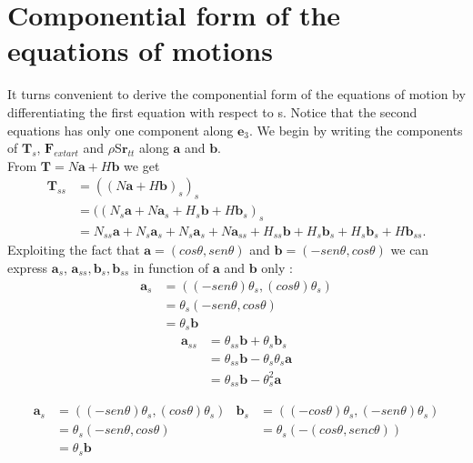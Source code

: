 

\section{Componential form of the equations of motions}\label{componential-form-of-the-equations-of-motion}
It turns convenient to derive the componential form of the equations of motion by differentiating the first equation with respect to s.
Notice that the second equations has only one component along $\mathbf{e}_3$.
We begin by writing the components of $\mathbf{T}_s$, $\mathbf{F}_{extart}$ and $\rho$S$\mathbf{r}_{tt}$ along $\mathbf{a}$ and $\mathbf{b}$.\\
From $\mathbf{T}=N\mathbf{a}+H\mathbf{b}$ we get
\begin{equation}
\begin{split}
\mathbf{T}_{ss}& =((N\mathbf{a}+H\mathbf{b})_s)_s\\
               & =((N_s\mathbf{a}+ N\mathbf{a}_s + H_s\mathbf{b} + H\mathbf{b}_s)_s\\
               & = N_{ss}\mathbf{a} + N_s\mathbf{a}_s + N_s\mathbf{a}_s + N\mathbf{a}_{ss} + H_{ss}\mathbf{b} + H_s\mathbf{b}_s + H_s\mathbf{b}_s + H\mathbf{b}_{ss}.
\end{split}
\end{equation}
Exploiting the fact that $\mathbf{a}=(cos\theta, sen\theta)$ and $\mathbf{b}=(-sen\theta, cos\theta)$ we can express $\mathbf{a}_s$, $\mathbf{a}_{ss}, \mathbf{b}_s, \mathbf{b}_{ss}$ in function of $\mathbf{a}$ and $\mathbf{b}$ only :
\begin{equation}
\begin{split}
\mathbf{a}_s& = ((-sen\theta)\theta_s, (cos\theta)\theta_s)\\
            & = \theta_s(-sen\theta, cos\theta)\\
            & =\theta_s\mathbf{b}
\end{split}
\end{equation}
\begin{equation}
\begin{split}
\mathbf{a}_{ss}& = \theta_{ss}\mathbf{b}+\theta_s\mathbf{b}_s \\
               & = \theta_{ss}\mathbf{b} - \theta_s\theta_s\mathbf{a}\\
               & = \theta_{ss}\mathbf{b} - \theta_s^2\mathbf{a}
\end{split}
\end{equation}

\begin{align}
\mathbf{a}_s& = ((-sen\theta)\theta_s, (cos\theta)\theta_s)  &\mathbf{b}_s& = ((-cos\theta)\theta_s, (-sen\theta)\theta_s)\\
            & = \theta_s(-sen\theta, cos\theta)              & & = \theta_s(-(cos\theta, senc\theta))\\
            & =\theta_s\mathbf{b}
\end{align}

 
 
 
 
 
 
  
  
  
  
  
  
  
  
  
  
  
  
  